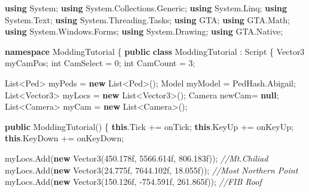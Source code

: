 \documentclass[
  openany]{book}
\newenvironment{Shaded}{\begin{snugshade}}{\end{snugshade}}
\newcommand{\CommentTok}[1]{\textcolor[rgb]{0.56,0.35,0.01}{\textit{#1}}}
\newcommand{\DataTypeTok}[1]{\textcolor[rgb]{0.13,0.29,0.53}{#1}}
\newcommand{\DecValTok}[1]{\textcolor[rgb]{0.00,0.00,0.81}{#1}}
\newcommand{\FloatTok}[1]{\textcolor[rgb]{0.00,0.00,0.81}{#1}}
\newcommand{\FunctionTok}[1]{\textcolor[rgb]{0.00,0.00,0.00}{#1}}
\newcommand{\KeywordTok}[1]{\textcolor[rgb]{0.13,0.29,0.53}{\textbf{#1}}}
\newcommand{\NormalTok}[1]{#1}
\begin{document}
\begin{Shaded}
\begin{Highlighting}[]
\KeywordTok{using}\NormalTok{ System;}
\KeywordTok{using}\NormalTok{ System.}\FunctionTok{Collections}\NormalTok{.}\FunctionTok{Generic}\NormalTok{;}
\KeywordTok{using}\NormalTok{ System.}\FunctionTok{Linq}\NormalTok{;}
\KeywordTok{using}\NormalTok{ System.}\FunctionTok{Text}\NormalTok{;}
\KeywordTok{using}\NormalTok{ System.}\FunctionTok{Threading}\NormalTok{.}\FunctionTok{Tasks}\NormalTok{;}
\KeywordTok{using}\NormalTok{ GTA;}
\KeywordTok{using}\NormalTok{ GTA.}\FunctionTok{Math}\NormalTok{;}
\KeywordTok{using}\NormalTok{ System.}\FunctionTok{Windows}\NormalTok{.}\FunctionTok{Forms}\NormalTok{;}
\KeywordTok{using}\NormalTok{ System.}\FunctionTok{Drawing}\NormalTok{;}
\KeywordTok{using}\NormalTok{ GTA.}\FunctionTok{Native}\NormalTok{;}

\KeywordTok{namespace}\NormalTok{ ModdingTutorial}
\NormalTok{\{}
    \KeywordTok{public} \KeywordTok{class}\NormalTok{ ModdingTutorial : Script    }
\NormalTok{    \{}
\NormalTok{        Vector3 myCamPos;}
        \DataTypeTok{int}\NormalTok{ CamSelect = }\DecValTok{0}\NormalTok{;}
        \DataTypeTok{int}\NormalTok{ CamCount = }\DecValTok{3}\NormalTok{;}

\NormalTok{        List<Ped> myPeds = }\KeywordTok{new}\NormalTok{ List<Ped>();}
\NormalTok{        Model myModel = PedHash.}\FunctionTok{Abigail}\NormalTok{;}
\NormalTok{        List<Vector3> myLocs = }\KeywordTok{new}\NormalTok{ List<Vector3>();}
\NormalTok{        Camera newCam= }\KeywordTok{null}\NormalTok{;}
\NormalTok{        List<Camera> myCam = }\KeywordTok{new}\NormalTok{ List<Camera>();}

        
        \KeywordTok{public} \FunctionTok{ModdingTutorial}\NormalTok{()}
\NormalTok{        \{}
            \KeywordTok{this}\NormalTok{.}\FunctionTok{Tick}\NormalTok{ += onTick;}
            \KeywordTok{this}\NormalTok{.}\FunctionTok{KeyUp}\NormalTok{ += onKeyUp;}
            \KeywordTok{this}\NormalTok{.}\FunctionTok{KeyDown}\NormalTok{ += onKeyDown;}

\NormalTok{            myLocs.}\FunctionTok{Add}\NormalTok{(}\KeywordTok{new} \FunctionTok{Vector3}\NormalTok{(}\FloatTok{450.178f}\NormalTok{, }\FloatTok{5566.614f}\NormalTok{, }\FloatTok{806.183f}\NormalTok{)); }\CommentTok{//Mt.Chiliad}
\NormalTok{            myLocs.}\FunctionTok{Add}\NormalTok{(}\KeywordTok{new} \FunctionTok{Vector3}\NormalTok{(}\FloatTok{24.775f}\NormalTok{, }\FloatTok{7644.102f}\NormalTok{, }\FloatTok{18.055f}\NormalTok{)); }\CommentTok{//Most Northern Point}
\NormalTok{            myLocs.}\FunctionTok{Add}\NormalTok{(}\KeywordTok{new} \FunctionTok{Vector3}\NormalTok{(}\FloatTok{150.126f}\NormalTok{, }\FloatTok{-754.591f}\NormalTok{, }\FloatTok{261.865f}\NormalTok{)); }\CommentTok{//FIB Roof}


\end{Highlighting}
\end{Shaded}
\end{document}
